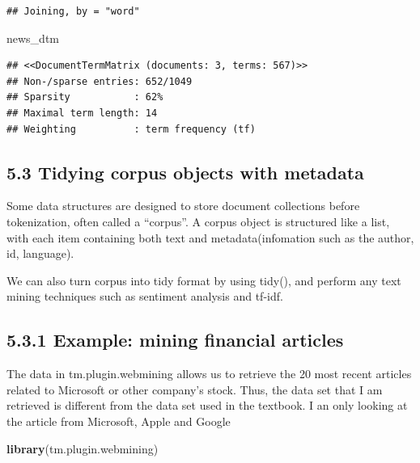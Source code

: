 \documentclass[]{article}
\newenvironment{Shaded}{\begin{snugshade}}{\end{snugshade}}
\newcommand{\KeywordTok}[1]{\textcolor[rgb]{0.13,0.29,0.53}{\textbf{#1}}}
\newcommand{\NormalTok}[1]{#1}
\begin{document}
\begin{verbatim}
## Joining, by = "word"
\end{verbatim}

\begin{Shaded}
\begin{Highlighting}[]
\NormalTok{news_dtm}
\end{Highlighting}
\end{Shaded}

\begin{verbatim}
## <<DocumentTermMatrix (documents: 3, terms: 567)>>
## Non-/sparse entries: 652/1049
## Sparsity           : 62%
## Maximal term length: 14
## Weighting          : term frequency (tf)
\end{verbatim}

\hypertarget{tidying-corpus-objects-with-metadata}{%
\subsection{5.3 Tidying corpus objects with
metadata}\label{tidying-corpus-objects-with-metadata}}

Some data structures are designed to store document collections before
tokenization, often called a ``corpus''. A corpus object is structured
like a list, with each item containing both text and metadata(infomation
such as the author, id, language).

We can also turn corpus into tidy format by using tidy(), and perform
any text mining techniques such as sentiment analysis and tf-idf.

\hypertarget{example-mining-financial-articles}{%
\subsection{5.3.1 Example: mining financial
articles}\label{example-mining-financial-articles}}

The data in tm.plugin.webmining allows us to retrieve the 20 most recent
articles related to Microsoft or other company's stock. Thus, the data
set that I am retrieved is different from the data set used in the
textbook. I an only looking at the article from Microsoft, Apple and
Google

\begin{Shaded}
\begin{Highlighting}[]
\KeywordTok{library}\NormalTok{(tm.plugin.webmining)}
\end{Highlighting}
\end{Shaded}
\end{document}

